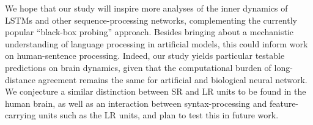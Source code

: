 We hope that our study will inspire more analyses of the inner dynamics of LSTMs and other sequence-processing networks, complementing the currently popular ``black-box probing'' approach. Besides bringing about a mechanistic understanding of language processing in artificial models, this could inform work on human-sentence processing. Indeed, our study yields particular testable predictions on brain dynamics, given that the computational burden of long-distance agreement remains the same for artificial and biological neural network. We conjecture a similar distinction between SR and LR units to be found in the human brain, as well as an interaction between syntax-processing and feature-carrying units such as the LR units, and plan to test this in future work.